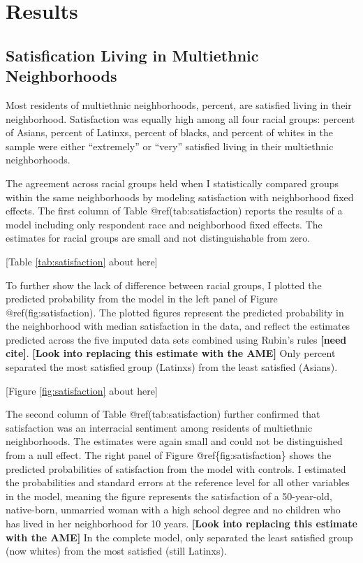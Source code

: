 \documentclass{baderart}
\begin{document}
\doublespacing
\section{Results}\label{results}

\subsection{Satisfication Living in Multiethnic Neighborhoods}\label{satisfication-living-in-multiethnic-neighborhoods}

Most residents of multiethnic neighborhoods, \meansatisfied percent, are satisfied living in their neighborhood. Satisfaction was equally high among all four racial groups: \apisatisfied percent of Asians, \hspsatisfied percent of Latinxs, \nhbsatisfied percent of blacks, and \nhwsatisfied percent of whites in the sample were either ``extremely'' or ``very'' satisfied living in their multiethnic neighborhoods.

The agreement across racial groups held when I statistically compared groups within the same neighborhoods by modeling satisfaction with neighborhood fixed effects. The first column of Table @ref(tab:satisfaction) reports the results of a model including only respondent race and neighborhood fixed effects. The estimates for racial groups are small and not distinguishable from zero.

{[}Table \ref{tab:satisfaction} about here{]}

To further show the lack of difference between racial groups, I plotted the predicted probability from the model in the left panel of Figure @ref(fig:satisfaction). The plotted figures represent the predicted probability in the neighborhood with median satisfaction in the data, and reflect the estimates predicted across the five imputed data sets combined using Rubin's rules \textbf{{[}need cite{]}}. \textbf{{[}Look into replacing this estimate with the AME{]}} Only \maxdiffone percent separated the most satisfied group (Latinxs) from the least satisfied (Asians).

{[}Figure \ref{fig:satisfaction} about here{]}

The second column of Table @ref(tab:satisfaction) further confirmed that satisfaction was an interracial sentiment among residents of multiethnic neighborhoods. The estimates were again small and could not be distinguished from a null effect. The right panel of Figure @ref\{fig:satisfaction\} shows the predicted probabilities of satisfaction from the model with controls. I estimated the probabilities and standard errors at the reference level for all other variables in the model, meaning the figure represents the satisfaction of a 50-year-old, native-born, unmarried woman with a high school degree and no children who has lived in her neighborhood for 10 years. \textbf{{[}Look into replacing this estimate with the AME{]}} In the complete model, only \maxdiffthree separated the least satisfied group (now whites) from the most satisfied (still Latinxs).
\end{document}
